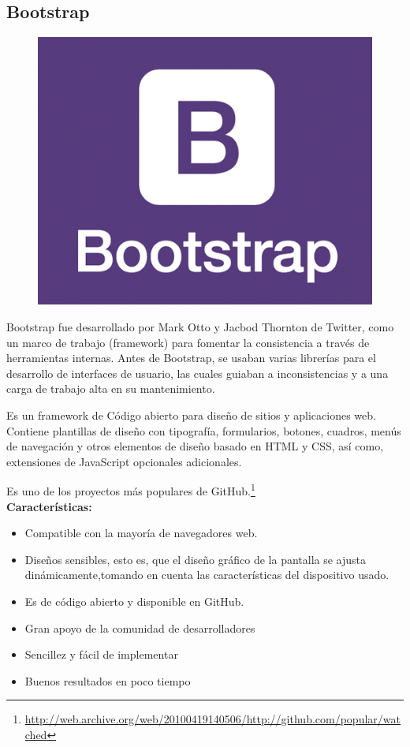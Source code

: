 \documentclass[a4paper, 12pt]{book}
\begin{document}
\subsection{Bootstrap}
\begin{figure}[hbtp]
\centering
\includegraphics[scale=0.2]{img/bootstrap.png} 
\end{figure}

Bootstrap fue desarrollado por Mark Otto y Jacbod Thornton de Twitter, como un marco de trabajo (framework) para fomentar la consistencia a través de herramientas internas. Antes de Bootstrap, se usaban varias librerías para el desarrollo de interfaces de usuario, las cuales guiaban a inconsistencias y a una carga de trabajo alta en su mantenimiento.

Es un framework de Código abierto para diseño de sitios y aplicaciones web. Contiene plantillas de diseño con tipografía, formularios, botones, cuadros, menús de navegación y otros elementos de diseño basado en HTML y CSS, así como, extensiones de JavaScript opcionales adicionales.

Es uno de los proyectos más populares de GitHub.\footnote{\url{http://web.archive.org/web/20100419140506/http://github.com/popular/watched}} \\
 \textbf{Características:} \
\begin{itemize}
\item Compatible con la mayoría de navegadores web.
\item Diseños sensibles, esto es, que el diseño gráfico de la pantalla se ajusta dinámicamente,tomando en cuenta las características del dispositivo usado.
\item Es de código abierto y disponible en GitHub.
\item Gran apoyo de la comunidad de desarrolladores
\item Sencillez y fácil de implementar
\item Buenos resultados en poco tiempo
\end{itemize}
\end{document}
